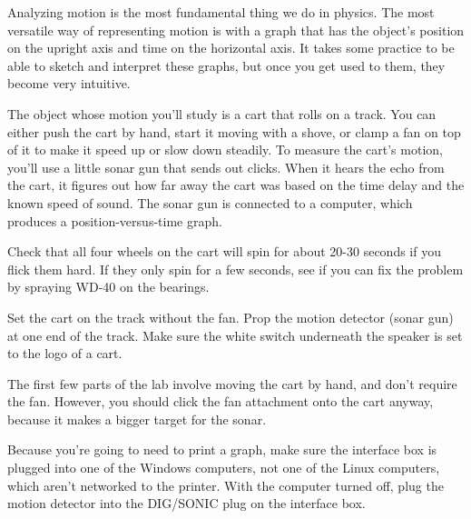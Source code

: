 \label{lab:kinematics}

\apparatus
{}


\introduction

Analyzing motion is the most fundamental thing we do in
physics. The most versatile way of representing motion is
with a graph that has the object's position on the upright
axis and time on the horizontal axis. It takes some practice
to be able to sketch and interpret these graphs, but once
you get used to them, they become very intuitive.

\apparatus
The object whose motion you'll study is a cart that rolls on
a track. You can either push the cart by hand, start it
moving with a shove, or clamp a fan on top of it to make it
speed up or slow down steadily. To measure the cart's
motion, you'll use a little sonar gun that sends out clicks.
When it hears the echo from the cart, it figures out how far
away the cart was based on the time delay and the known
speed of sound. The sonar gun is connected to a computer,
which produces a position-versus-time graph.


\setup

Check that all four wheels on the cart will spin for about 20-30 seconds
if you flick them hard. If they only spin for a few seconds, see if
you can fix the problem by spraying WD-40 on the bearings.

Set the cart on the track without the fan. Prop the motion
detector (sonar gun) at one end of the track. Make sure the white
switch underneath the speaker is set to the logo of a cart.

The first few parts of the lab involve moving the cart by hand, and
don't require the fan. However, you should click the fan attachment
onto the cart anyway, because it makes a bigger target for the sonar.

Because you're going to need to print a graph, make sure the interface
box is plugged into one of the Windows computers, not one of the Linux
computers, which aren't networked to the printer.
With the computer turned off, plug the motion detector into
the DIG/SONIC plug on the interface box.

